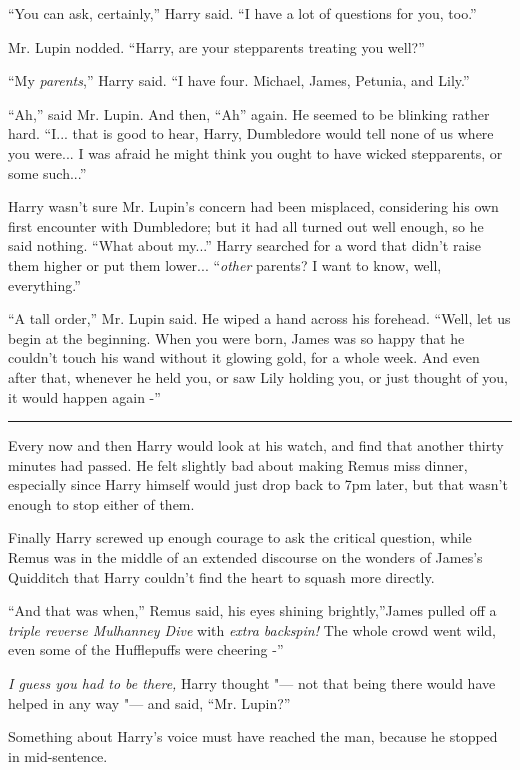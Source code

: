 ``You can ask, certainly,'' Harry said. ``I have a lot of questions for
you, too.''

Mr. Lupin nodded. ``Harry, are your stepparents treating you well?''

``My \emph{parents},'' Harry said. ``I have four. Michael, James,
Petunia, and Lily.''

``Ah,'' said Mr. Lupin. And then, ``Ah'' again. He seemed to be blinking
rather hard. ``I... that is good to hear, Harry, Dumbledore would
tell none of us where you were... I was afraid he might think you
ought to have wicked stepparents, or some such...''

Harry wasn't sure Mr. Lupin's concern had been misplaced, considering
his own first encounter with Dumbledore; but it had all turned out well
enough, so he said nothing. ``What about my...'' Harry searched for
a word that didn't raise them higher or put them lower...
``\emph{other} parents? I want to know, well, everything.''

``A tall order,'' Mr. Lupin said. He wiped a hand across his forehead.
``Well, let us begin at the beginning. When you were born, James was so
happy that he couldn't touch his wand without it glowing gold, for a
whole week. And even after that, whenever he held you, or saw Lily
holding you, or just thought of you, it would happen again -''

\begin{center}\rule{3in}{0.4pt}\end{center}

Every now and then Harry would look at his watch, and find that another
thirty minutes had passed. He felt slightly bad about making Remus miss
dinner, especially since Harry himself would just drop back to 7pm
later, but that wasn't enough to stop either of them.

Finally Harry screwed up enough courage to ask the critical question,
while Remus was in the middle of an extended discourse on the wonders of
James's Quidditch that Harry couldn't find the heart to squash more
directly.

``And that was when,'' Remus said, his eyes shining brightly,''James
pulled off a \emph{triple reverse Mulhanney Dive} with \emph{extra
backspin!} The whole crowd went wild, even some of the Hufflepuffs were
cheering -''

\emph{I guess you had to be there,} Harry thought "--- not that being there
would have helped in any way "--- and said, ``Mr. Lupin?''

Something about Harry's voice must have reached the man, because he
stopped in mid-sentence.

